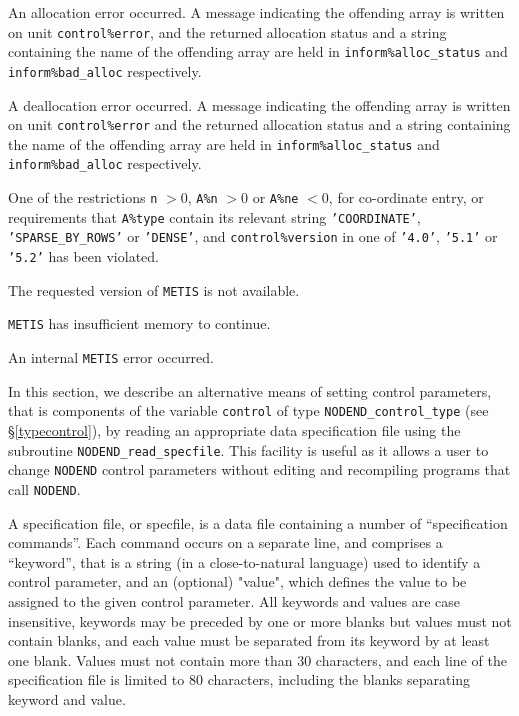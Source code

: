\documentclass{galahad}
\newcommand{\packagename}{NODEND}
\begin{document}
\begin{description}

\itt{\galerrallocate} An allocation error occurred. A message indicating
the offending
array is written on unit {\tt control\%error}, and the returned allocation
status and a string containing the name of the offending array
are held in {\tt inform\%alloc\_\-status}
and {\tt inform\%bad\_alloc} respectively.

\itt{\galerrdeallocate} A deallocation error occurred.
A message indicating the offending
array is written on unit {\tt control\%error} and the returned allocation
status and a string containing the name of the offending array
are held in {\tt inform\%alloc\_\-status}
and {\tt inform\%bad\_alloc} respectively.

\itt{\galerrrestrictions} One of the restrictions
 {\tt n} $> 0$,
 {\tt A\%n} $> 0$ or
 {\tt A\%ne} $< 0$, for co-ordinate entry,
  or requirements that {\tt A\%type}
  contain its relevant string
 {\tt 'COORDINATE'}, {\tt 'SPARSE\_BY\_ROWS'} or {\tt 'DENSE'}, and
 {\tt control\%version} in one of {\tt '4.0'}, {\tt '5.1'} or {\tt '5.2'}
  has been violated.

\itt{\galunknownsolver} The requested version of {\tt METIS} is not available.

\itt{\galerrmetismemory} {\tt METIS} has insufficient memory to continue.

\itt{\galerrmetis} An internal {\tt METIS} error occurred.

\end{description}


\galcontrolfeatures
\noindent In this section, we describe an alternative means of setting
control parameters, that is components of the variable {\tt control} of type
{\tt \packagename\_control\_type}
(see \S\ref{typecontrol}),
by reading an appropriate data specification file using the
subroutine {\tt \packagename\_read\_specfile}. This facility
is useful as it allows a user to change  {\tt \packagename} control parameters
without editing and recompiling programs that call {\tt \packagename}.

A specification file, or specfile, is a data file containing a number of
``specification commands''. Each command occurs on a separate line,
and comprises a ``keyword'',
that is a string (in a close-to-natural language) used to identify a
control parameter, and
an (optional) "value", which defines the value to be assigned to the given
control parameter. All keywords and values are case insensitive,
keywords may be preceded by one or more blanks but
values must not contain blanks, and
each value must be separated from its keyword by at least one blank.
Values must not contain more than 30 characters, and
each line of the specification file is limited to 80 characters,
including the blanks separating keyword and value.
\end{document}
